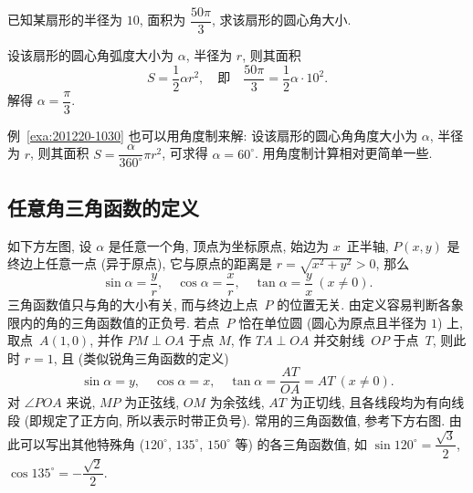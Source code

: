 \begin{example}\label{exa:201220-1030}
    已知某扇形的半径为 $10$, 面积为 $\dfrac{50\pi}3$, 求该扇形的圆心角大小.
\end{example}
\begin{solution}
    设该扇形的圆心角弧度大小为 $\alpha$, 半径为 $r$, 则其面积 \[S=\frac12\alpha r^2,\quad\text{即}\quad 
        \frac{50\pi}3= \frac12 \alpha\cdot 10^2.\]
    解得 $\alpha=\dfrac\pi3$.
\end{solution}
\begin{remark}
    例~\ref{exa:201220-1030} 也可以用角度制来解: 设该扇形的圆心角角度大小为 $\alpha$, 半径为 $r$, 则其面积 $S=\dfrac{\alpha}{360^\circ} \pi r^2$, 可求得 $\alpha=60^\circ$. 用角度制计算相对更简单一些.
\end{remark}

\subsection{任意角三角函数的定义}

  如下方左图, 设 $\alpha$ 是任意一个角, 顶点为坐标原点, 
  始边为 $x$~正半轴, $P(x, y)$ 是终边上任意一点 (异于原点), 
  它与原点的距离是 $r= \sqrt{x^2+ y^2}> 0$, 那么 
  \[\sin\alpha= \frac{y}{r},\quad
    \cos\alpha= \frac{x}{r},\quad 
    \tan\alpha= \frac{y}{x}\ (x\neq 0).\]
  三角函数值只与角的大小有关, 而与终边上点~$P$ 的位置无关. 由定义容易判断各象限内的角的三角函数值的正负号. 若点~$P$ 恰在单位圆 (圆心为原点且半径为 $1$) 上, 取点~$A(1,0)$, 并作 $PM\perp OA$ 于点 $M$, 作 $TA\perp OA$ 并交射线~$OP$ 于点~$T$, 则此时 $r=1$, 且 (类似锐角三角函数的定义)
  \[\sin\alpha= y,\quad
    \cos\alpha= x,\quad 
    \tan\alpha= \frac{AT}{OA}= AT\ (x\neq 0).\]
  对 $\angle{POA}$ 来说, $MP$ 为正弦线, $OM$ 为余弦线, $AT$ 为正切线, 
  且各线段均为有向线段 (即规定了正方向, 所以表示时带正负号). 常用的三角函数值, 参考下方右图. 由此可以写出其他特殊角 ($120^\circ$, $135^\circ$, $150^\circ$ 等) 的各三角函数值, 如 $\sin 120^\circ= \dfrac{\sqrt3}2$, $\cos135^\circ= -\dfrac{\sqrt2}2$.
  
